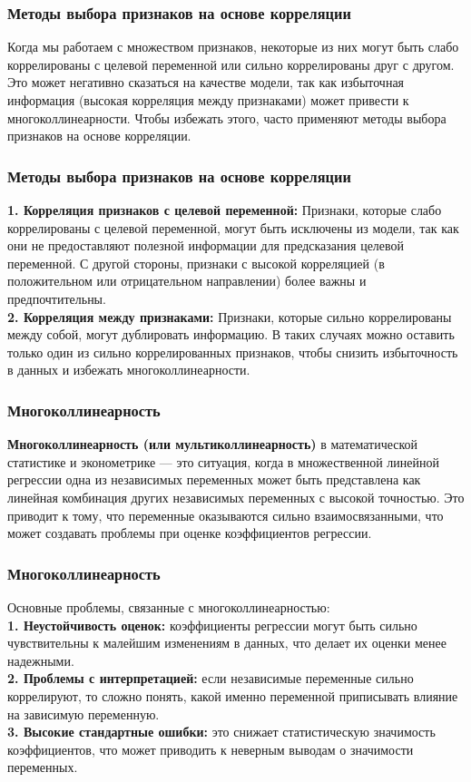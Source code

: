 \documentclass[aspectratio=169]{beamer}
\begin{document}
\begin{frame}
\frametitle{Методы выбора признаков на основе корреляции}
Когда мы работаем с множеством признаков, некоторые из них могут быть слабо коррелированы с целевой переменной или сильно коррелированы друг с другом. Это может негативно сказаться на качестве модели, так как избыточная информация (высокая корреляция между признаками) может привести к многоколлинеарности. Чтобы избежать этого, часто применяют методы выбора признаков на основе корреляции.\\
\end{frame}

\begin{frame}
\frametitle{Методы выбора признаков на основе корреляции}
{\bf 1. Корреляция признаков с целевой переменной:} Признаки, которые слабо коррелированы с целевой переменной, могут быть исключены из модели, так как они не предоставляют полезной информации для предсказания целевой переменной. С другой стороны, признаки с высокой корреляцией (в положительном или отрицательном направлении) более важны и предпочтительны.\\
{\bf 2. Корреляция между признаками:} Признаки, которые сильно коррелированы между собой, могут дублировать информацию. В таких случаях можно оставить только один из сильно коррелированных признаков, чтобы снизить избыточность в данных и избежать многоколлинеарности.
\end{frame}

\begin{frame}
\frametitle{Многоколлинеарность}
{\bf Многоколлинеарность (или мультиколлинеарность)} в математической статистике и эконометрике — это ситуация, когда в множественной линейной регрессии одна из независимых переменных может быть представлена как линейная комбинация других независимых переменных с высокой точностью. Это приводит к тому, что переменные оказываются сильно взаимосвязанными, что может создавать проблемы при оценке коэффициентов регрессии.\\
\end{frame}

\begin{frame}
\frametitle{Многоколлинеарность}
Основные проблемы, связанные с многоколлинеарностью:\\
{\bf 1. Неустойчивость оценок:} коэффициенты регрессии могут быть сильно чувствительны к малейшим изменениям в данных, что делает их оценки менее надежными.\\
{\bf 2. Проблемы с интерпретацией:} если независимые переменные сильно коррелируют, то сложно понять, какой именно переменной приписывать влияние на зависимую переменную.\\
{\bf 3. Высокие стандартные ошибки:} это снижает статистическую значимость коэффициентов, что может приводить к неверным выводам о значимости переменных.
\end{frame}
\end{document}
